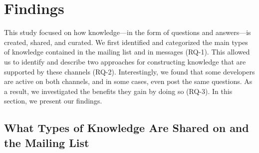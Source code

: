 \section{Findings}
\label{cha:findings}
This study focused on how knowledge---in the form of questions and answers---is created, shared, and curated. We first identified and categorized the main types of knowledge contained in the \RH mailing list and in \SO messages (RQ-1). This allowed us to identify and describe two approaches for constructing knowledge that are supported by these channels (RQ-2). Interestingly, we found that some developers are active on both channels, and in some cases, even post the same questions. As a result, we investigated the benefits they gain by doing so (RQ-3). In this section, we present our findings.

\subsection{What Types of Knowledge Are Shared on \SO and the \RH Mailing List}
\label{cha:findings-types}

